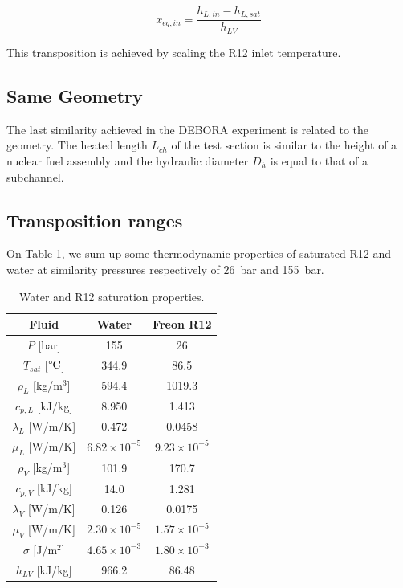 \begin{equation}
x_{eq,in} = \frac{h_{L,in} - h_{L,sat}}{h_{LV}}
\end{equation}

\begin{note*}{}
This transposition is achieved by scaling the R12 inlet temperature.
\end{note*}

\subsection{Same Geometry}

The last similarity achieved in the DEBORA experiment is related to the geometry. The heated length $L_{ch}$ of the test section is similar to the height of a nuclear fuel assembly and the hydraulic diameter $D_{h}$ is equal to that of a subchannel.


\subsection{Transposition ranges}

On Table \ref{tab:R12_PWR_properties}, we sum up some thermodynamic properties of saturated R12 and water at similarity pressures respectively of 26\ bar and 155\ bar.

\begin{table}[!h]
\centering
\begin{tabular}{c||c|c} 

Fluid & Water & Freon R12 \\
\hline 
\hline
$P$ [bar] & 155 & 26\\
%
$T_{sat}$ [$\degree\mathrm{C}$] & 344.9 & 86.5 \\
%
\hline
\hline
$\rho_{L}$ [kg/m$^{3}$] & 594.4 & 1019.3 \\
%
$c_{p,L}$ [kJ/kg] & 8.950 & 1.413\\ 
%
$\lambda_{L}$ [W/m/K] & 0.472 & 0.0458\\
%
$\mu_{L}$ [W/m/K] & $6.82 \times 10^{-5}$ & $9.23 \times 10^{-5}$\\
\hline
\hline 
$\rho_{V}$ [kg/m$^{3}$] & 101.9 & 170.7 \\
%
$c_{p,V}$ [kJ/kg] & 14.0 & 1.281\\ 
%
$\lambda_{V}$ [W/m/K] & 0.126 & 0.0175\\
%
$\mu_{V}$ [W/m/K] & $2.30 \times 10^{-5}$ & $1.57 \times 10 ^{-5}$\\
\hline
\hline
$\sigma$ [J/m$^{2}$] & $4.65\times 10^{-3}$ & $1.80 \times 10^{-3}$ \\
%
$h_{LV}$ [kJ/kg] & 966.2 & 86.48 \\
\end{tabular}

\caption{Water and R12 saturation properties.}
\label{tab:R12_PWR_properties}

\end{table}



